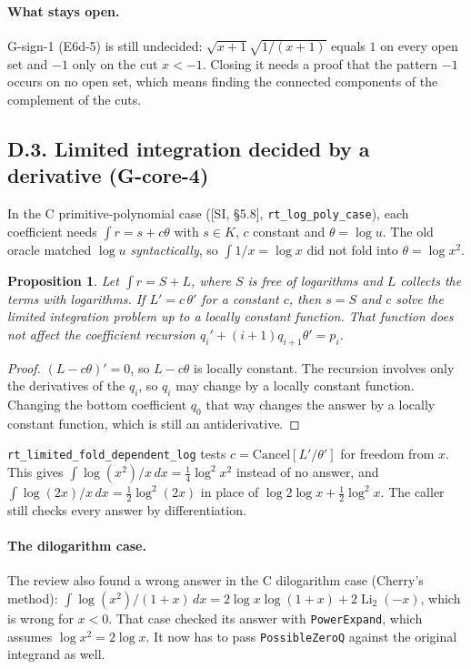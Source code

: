 \documentclass[11pt]{article}
\newtheorem{proposition}[theorem]{Proposition}
\theoremstyle{definition}
\theoremstyle{remark}
\newcommand{\code}[1]{\texttt{#1}}
\begin{document}
\paragraph{What stays open.} G-sign-1 (E6d-5) is still undecided:
$\sqrt{x+1}\sqrt{1/(x+1)}$ equals $1$ on every open set and $-1$ only on the cut
$x<-1$. Closing it needs a proof that the pattern $-1$ occurs on no open set,
which means finding the connected components of the complement of the cuts.

\subsection*{D.3. Limited integration decided by a derivative (G-core-4)}

In the C primitive-polynomial case ([SI, \S5.8], \code{rt\_log\_poly\_case}), each
coefficient needs $\int r=s+c\theta$ with $s\in K$, $c$ constant and
$\theta=\log u$. The old oracle matched $\log u$ \emph{syntactically}, so
$\int 1/x=\log x$ did not fold into $\theta=\log x^2$.

\begin{proposition}
Let $\int r=S+L$, where $S$ is free of logarithms and $L$ collects the terms
with logarithms. If $L'=c\,\theta'$ for a constant $c$, then $s=S$ and $c$
solve the limited integration problem up to a locally constant function. That
function does not affect the coefficient recursion
$q_i'+(i+1)q_{i+1}\theta'=p_i$.
\end{proposition}

\begin{proof}
$(L-c\theta)'=0$, so $L-c\theta$ is locally constant. The recursion involves
only the derivatives of the $q_i$, so $q_i$ may change by a locally constant
function. Changing the bottom coefficient $q_0$ that way changes the answer
by a locally constant function, which is still an antiderivative.
\end{proof}

\code{rt\_limited\_fold\_dependent\_log} tests $c=\mathrm{Cancel}[L'/\theta']$
for freedom from $x$. This gives $\int\log(x^2)/x\,dx=\tfrac14\log^2x^2$
instead of no answer, and $\int\log(2x)/x\,dx=\tfrac12\log^2(2x)$ in place of
$\log2\log x+\tfrac12\log^2x$. The caller still checks every answer by
differentiation.

\paragraph{The dilogarithm case.} The review also found a wrong answer in the
C dilogarithm case (Cherry's method):
$\int\log(x^2)/(1+x)\,dx=2\log x\log(1+x)+2\operatorname{Li}_2(-x)$, which is
wrong for $x<0$. That case checked its answer with \code{PowerExpand}, which
assumes $\log x^2=2\log x$. It now has to pass \code{PossibleZeroQ} against the
original integrand as well.
\end{document}
